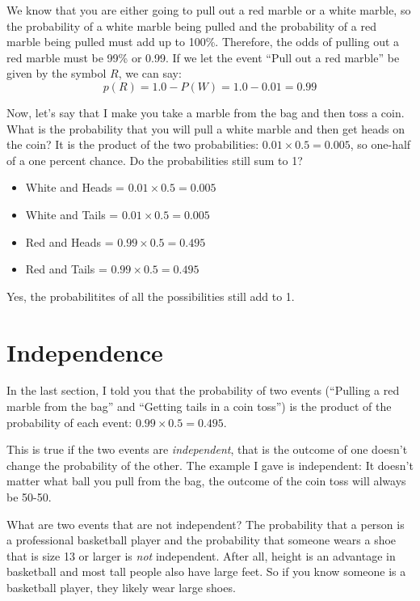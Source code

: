 We know that you are either going to pull out a red marble or a white marble,
so the probability of a white marble being pulled and the probability
of a red marble being pulled must add up to 100\%. Therefore, the odds of
pulling out a red marble must be 99\% or 0.99. If we let the event ``Pull out a red marble'' be given by the symbol $R$, we can say:
\begin{equation*}
  p(R) = 1.0 - P(W) = 1.0 - 0.01 = 0.99
\end{equation*}

Now, let's say that I make you take a marble from the bag and then
toss a coin. What is the probability that you will pull a white marble
and then get heads on the coin? It is the product of the two
probabilities: $0.01 \times 0.5 = 0.005$, so one-half of a one percent
chance. Do the probabilities still sum to 1?
\begin{itemize}
\item White and Heads = $0.01 \times 0.5 = 0.005$
\item White and Tails = $0.01 \times 0.5 = 0.005$
\item Red and Heads = $0.99 \times 0.5 = 0.495$
\item Red and Tails = $0.99 \times 0.5 = 0.495$
\end{itemize}
Yes, the probabilitites of all the possibilities still add to 1.

\section{Independence}

In the last section, I told you that the probability of two events
(``Pulling a red marble from the bag'' and ``Getting tails in a coin
toss'') is the product of the probability of each event: $0.99 \times 0.5 = 0.495$.

This is true if the two events are \textit{independent}, that is the
outcome of one doesn't change the probability of the other.  The
example I gave is independent: It doesn't matter what ball you pull
from the bag, the outcome of the coin toss will always be 50-50.

What are two events that are not independent? The probability that a
person is a professional basketball player and the probability that
someone wears a shoe that is size 13 or larger is \textit{not}
independent. After all, height is an advantage in basketball and most
tall people also have large feet. So if you know someone is a
basketball player, they likely wear large shoes.

